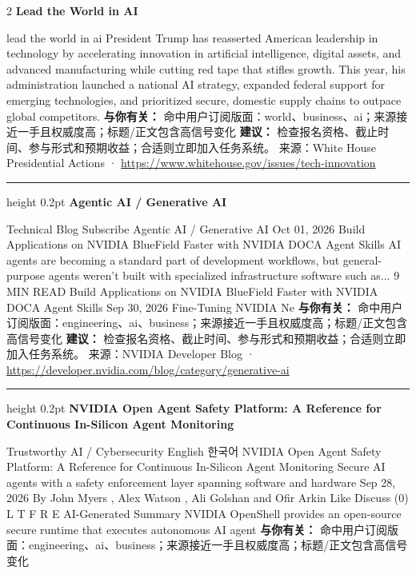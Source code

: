 \documentclass[10.5pt]{ctexart}
\begin{document}
\begin{multicols}{2}
{\large\bfseries Lead the World in AI}\par
lead the world in ai President Trump has reasserted American leadership in technology by accelerating innovation in artificial intelligence, digital assets, and advanced manufacturing while cutting red tape that stifles growth. This year, his administration launched a national AI strategy, expanded federal support for emerging technologies, and prioritized secure, domestic supply chains to outpace global competitors.
\textbf{与你有关：} 命中用户订阅版面：world、business、ai；来源接近一手且权威度高；标题/正文包含高信号变化
\textbf{建议：} 检查报名资格、截止时间、参与形式和预期收益；合适则立即加入任务系统。
{\footnotesize\color{ormuted} 来源：White House Presidential Actions · \url{https://www.whitehouse.gov/issues/tech-innovation}}
\vspace{2mm}
\hrule height 0.2pt
\vspace{2mm}
{\large\bfseries Agentic AI / Generative AI}\par
Technical Blog Subscribe Agentic AI / Generative AI Oct 01, 2026 Build Applications on NVIDIA BlueField Faster with NVIDIA DOCA Agent Skills AI agents are becoming a standard part of development workflows, but general-purpose agents weren't built with specialized infrastructure software such as... 9 MIN READ Build Applications on NVIDIA BlueField Faster with NVIDIA DOCA Agent Skills Sep 30, 2026 Fine-Tuning NVIDIA Ne
\textbf{与你有关：} 命中用户订阅版面：engineering、ai、business；来源接近一手且权威度高；标题/正文包含高信号变化
\textbf{建议：} 检查报名资格、截止时间、参与形式和预期收益；合适则立即加入任务系统。
{\footnotesize\color{ormuted} 来源：NVIDIA Developer Blog · \url{https://developer.nvidia.com/blog/category/generative-ai}}
\vspace{2mm}
\hrule height 0.2pt
\vspace{2mm}
{\large\bfseries NVIDIA Open Agent Safety Platform: A Reference for Continuous In-Silicon Agent Monitoring}\par
Trustworthy AI / Cybersecurity English 한국어 NVIDIA Open Agent Safety Platform: A Reference for Continuous In-Silicon Agent Monitoring Secure AI agents with a safety enforcement layer spanning software and hardware Sep 28, 2026 By John Myers , Alex Watson , Ali Golshan and Ofir Arkin Like Discuss (0) L T F R E AI-Generated Summary NVIDIA OpenShell provides an open-source secure runtime that executes autonomous AI agent
\textbf{与你有关：} 命中用户订阅版面：engineering、ai、business；来源接近一手且权威度高；标题/正文包含高信号变化

\end{multicols}
\end{document}
